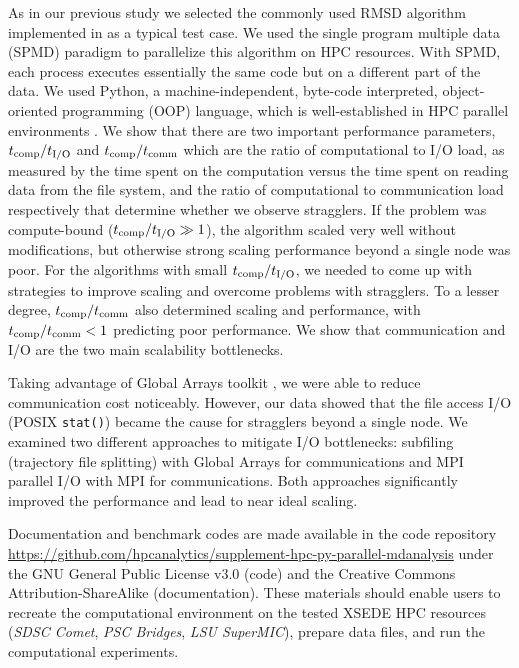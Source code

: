 As in our previous study we selected the commonly used RMSD algorithm implemented in  as a typical test case.
We used the single program multiple data (SPMD) paradigm to parallelize this algorithm on HPC resources.
With SPMD, each process executes essentially the same code but on a different part of the data. 
We used Python, a machine-independent, byte-code interpreted, object-oriented programming (OOP) language, which is well-established in HPC parallel environments \cite{GAiN}. 
We show that there are two important performance parameters, ${t}_{\text{comp}}/{t}_{\text{I/O}}$ and ${t}_{\text{comp}}/t_{\text{comm}}$ which are the ratio of computational to I/O load, as measured by the time spent on the computation versus the time spent on reading data from the file system, and the ratio of computational to communication load respectively that determine whether we observe stragglers.
If the problem was compute-bound (${t}_{\text{comp}}/{t}_{\text{I/O}} \gg 1$), the algorithm scaled very well without modifications, but otherwise strong scaling performance beyond a single node was poor.  
For the algorithms with small ${t}_{\text{comp}}/{t}_{\text{I/O}}$, we needed to come up with strategies to improve scaling and overcome problems with stragglers.
To a lesser degree, ${t}_{\text{comp}}/t_{\text{comm}}$ also determined scaling and performance, with ${t}_{\text{comp}}/t_{\text{comm}} < 1$ predicting poor performance.
We show that communication and I/O are the two main scalability bottlenecks.

Taking advantage of Global Arrays toolkit \cite{GA, GAiN}, we were able to reduce communication cost noticeably.
However, our data showed that the file access I/O (POSIX \texttt{stat()}) became the cause for stragglers beyond a single node.
We examined two different approaches to mitigate I/O bottlenecks: subfiling (trajectory file splitting) with Global Arrays for communications and MPI parallel I/O with MPI for communications.
Both approaches significantly improved the performance and lead to near ideal scaling.

Documentation and benchmark codes are made available in the code repository \url{https://github.com/hpcanalytics/supplement-hpc-py-parallel-mdanalysis} under the GNU General Public License v3.0 (code) and the Creative Commons Attribution-ShareAlike (documentation). 
These materials should enable users to recreate the computational environment on the tested XSEDE HPC resources (\emph{SDSC Comet}, \emph{PSC Bridges}, \emph{LSU SuperMIC}), prepare data files, and run the computational experiments.